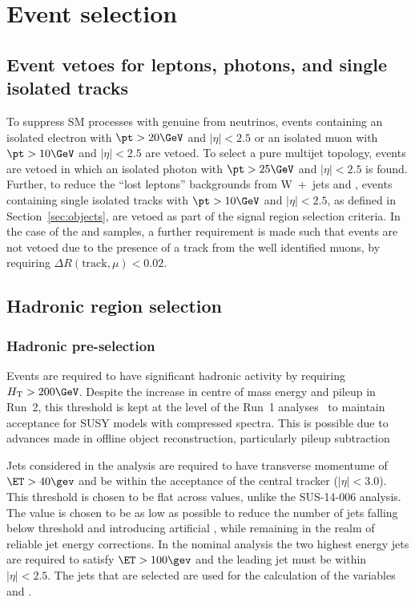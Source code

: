 \section{Event selection}
\label{sec:selection}

\subsection{Event vetoes for leptons, photons, and single isolated tracks\label{sec:vetoes}}

To suppress SM processes with genuine \met from neutrinos, events
containing an isolated electron with $\pt > 20\GeV$ and $|\eta| < 2.5$ or an isolated muon
with $\pt > 10\GeV$ and $|\eta| < 2.5$ are vetoed. To select a pure
multijet topology, events are vetoed in which an isolated
photon with $\pt > 25\GeV$ and $|\eta| < 2.5$ is
found.  Further, to reduce the ``lost leptons'' backgrounds from W~+~jets 
and \ttbar, events containing single isolated tracks with $\pt >
10\GeV$ and $|\eta| < 2.5$, as defined in
Section~\ref{sec:objects}, are vetoed as part of the signal
region selection criteria. In the case of the \mj and \mmj
samples, a further requirement is made such that events are not vetoed
due to the presence of a track from the well identified muons, by
requiring $\Delta R(\textrm{track},\mu) < 0.02$.


\subsection{Hadronic region selection}
\label{sec:hadSelection}

\subsubsection{Hadronic pre-selection}
Events are required to have significant hadronic activity by requiring
$\scalht > 200\GeV$. Despite the increase in centre of mass energy and pileup
in Run~2, this threshold is kept at the level of the Run~1 analyses~\cite{Chatrchyan:2013lya}  
to maintain acceptance for SUSY models with compressed spectra. This is possible due to advances 
made in offline object reconstruction, particularly pileup
subtraction%

Jets considered in the analysis are required to have transverse momentume of $\ET>40\gev$ and be
within the acceptance of the central tracker ($|\eta|<3.0$). This threshold is chosen
to be flat across \HT values, unlike the SUS-14-006 analysis. The \ET value is
chosen to be as low as possible to reduce the number of jets falling below
threshold and introducing artificial \mht, while remaining in the realm of
reliable jet energy corrections. In the nominal analysis the two highest energy jets
are required to satisfy $\ET>100\gev$ and the leading jet must be within $|\eta|<2.5$. 
The jets that are selected are used for the calculation of the variables \HT and \mht.


